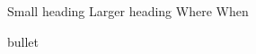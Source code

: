 \begin{cventries}
\cventry
  {Small heading}
  {Larger heading}
  {Where}
  {When}
  {
    \begin{cvitems}
      \item {bullet}
    \end{cvitems}
  }
  
\end{cventries}
